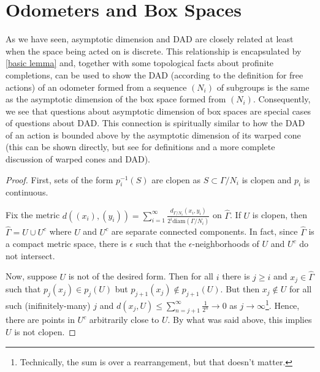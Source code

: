 \documentclass[12pt]{article}
\newcommand{\diam}{\text{diam}}
\newcommand{\dad}{\text{DAD}}
\begin{document}
\section{Odometers and Box Spaces} \label{odometers and box spaces}
\normalfont
As we have seen, asymptotic dimension and DAD are closely related at least when the space being acted on is discrete.  This relationship is encapsulated by \ref{basic lemma} and, together with some topological facts about profinite completions, can be used to show the DAD (according to the definition for free actions) of an odometer formed from a sequence $(N_i)$ of subgroups is the same as the asymptotic dimension of the box space formed from $(N_i)$.  Consequently, we see that questions about asymptotic dimension of box spaces are special cases of questions about $\dad$.  This connection is spiritually similar to how the DAD of an action is bounded above by the asymptotic dimension of its warped cone (this can be shown directly, but see \cite{warpedcones} for definitions and a more complete discussion of warped cones and DAD).  


 \label{lemma3}

\begin{proof}

First, sets of the form $p_i^{-1}(S)$ are clopen as $S\subset \Gamma/N_i$ is clopen and $p_i$ is continuous.  

Fix the metric $d((x_i), (y_i)) = \sum_{i=1}^{\infty} \frac{d_{\Gamma/N_i}(x_i, y_i)}{2^i\diam(\Gamma/N_i)}$ on $\widehat{\Gamma}$.  If $U$ is clopen, then $\widehat{\Gamma} = U\cup U^c$ where $U$ and $U^c$ are separate connected components.  In fact, since $\widehat{\Gamma}$ is a compact metric space, there is $\epsilon$ such that the $\epsilon$-neighborhoods of $U$ and $U^c$ do not intersect.  

Now, suppose $U$ is not of the desired form.  Then for all $i$ there is $j\geq i$ and $x_j\in\widehat{\Gamma}$ such that $p_j(x_j)\in p_j(U)$ but $p_{j+1}(x_j)\notin p_{j+1}(U)$.  But then $x_j\notin U$ for all such (inifinitely-many) $j$ and $d(x_j, U)\leq \sum_{n=j+1}^\infty \frac{1}{2^n}\to 0$ as $j\to \infty$\footnote{Technically, the sum is over a rearrangement, but that doesn't matter.}.  Hence, there are points in $U^c$ arbitrarily close to $U$.  By what was said above, this implies $U$ is not clopen. \end{proof}
\end{document}
